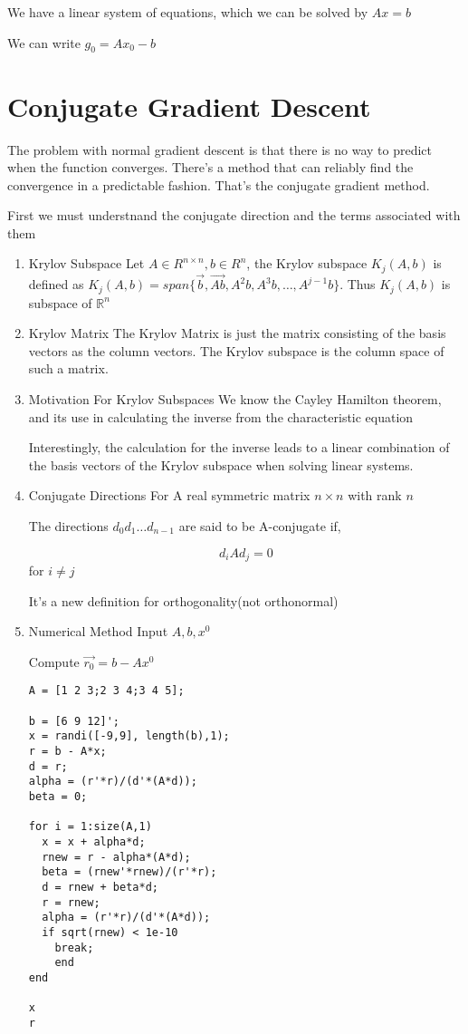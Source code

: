 \documentclass[11pt]{report}
\begin{document}
We have a linear system of equations, which we can be solved by \(Ax=b\)

We can write \(g_0 = Ax_{0} - b\)
\section{Conjugate Gradient Descent}
\label{sec:orgb459b81}
The problem with normal gradient descent is that there is no way to predict when the function converges. There's a method that can reliably find the convergence in a predictable fashion. That's the conjugate gradient method.

First we must understnand the conjugate direction and the terms associated with them
\begin{enumerate}
\item Krylov Subspace
\label{sec:org3733c41}
Let \(A \in R^{n \times n}, b \in R^n\), the Krylov subspace \(K_j(A,b)\) is defined as \(K_j(A,b) = span \{\vec{b}, \vec{Ab}, A^2b, A^3b, \dots , A^{j-1}b\}\). Thus \(K_j(A,b)\) is subspace of \(\mathbb{R}^n\)
\item Krylov Matrix
\label{sec:org617ca33}
The Krylov Matrix is just the matrix consisting of the basis vectors as the column vectors. The Krylov subspace is the column space of such a matrix.
\item Motivation For Krylov Subspaces
\label{sec:orgd8cbc9b}
We know the Cayley Hamilton theorem, and its use in calculating the inverse from the characteristic equation

Interestingly, the calculation for the inverse leads to a linear combination of the basis vectors of the Krylov subspace when solving linear systems.
\item Conjugate Directions
\label{sec:org250a77d}
For A real symmetric matrix \(n \times n\) with rank \(n\)

The directions \(d_0 d_1 \dots d_{n-1}\) are said to be A-conjugate if,

$$d_i Ad_j = 0 $$ for \(i \neq j\)

It's a new definition for orthogonality(not orthonormal)
\item Numerical Method
\label{sec:orgc6875f7}
Input \(A,b,x^{0}\)

Compute \(\vec{r_{0}} = b - A x^0\)
\begin{verbatim}
A = [1 2 3;2 3 4;3 4 5];

b = [6 9 12]';
x = randi([-9,9], length(b),1);
r = b - A*x;
d = r;
alpha = (r'*r)/(d'*(A*d));
beta = 0;

for i = 1:size(A,1)
  x = x + alpha*d;
  rnew = r - alpha*(A*d);
  beta = (rnew'*rnew)/(r'*r);
  d = rnew + beta*d;
  r = rnew;
  alpha = (r'*r)/(d'*(A*d));
  if sqrt(rnew) < 1e-10
    break;
    end
end

x
r
\end{verbatim}
\end{enumerate}
\end{document}
